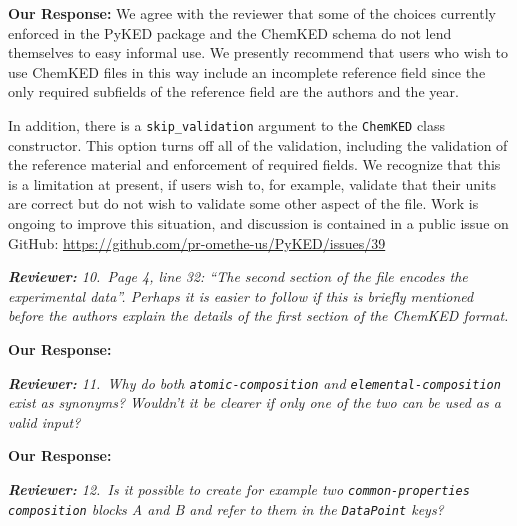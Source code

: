 \documentclass[a4paper,10pt]{elsarticle}
\newenvironment{reviewer}{\vspace{0.5\baselineskip}\begingroup\itshape\textbf{Reviewer:}}{\endgroup\vspace{0.5\baselineskip}}
\newenvironment{response}{\vspace{0.5\baselineskip}\textbf{Our Response:}}{\vspace{0.5\baselineskip}}
\begin{document}
\begin{response}
    We agree with the reviewer that some of the choices currently enforced in the PyKED package and
    the ChemKED schema do not lend themselves to easy informal use. We presently recommend that
    users who wish to use ChemKED files in this way include an incomplete reference field since the
    only required subfields of the reference field are the authors and the year.

    In addition, there is a \verb|skip_validation| argument to the \verb|ChemKED| class constructor.
    This option turns off all of the validation, including the validation of the reference material
    and enforcement of required fields. We recognize that this is a limitation at present, if users
    wish to, for example, validate that their units are correct but do not wish to validate some
    other aspect of the file. Work is ongoing to improve this situation, and discussion is contained
    in a public issue on GitHub: \url{https://github.com/pr-omethe-us/PyKED/issues/39}
\end{response}

\begin{reviewer}
    10.~Page 4, line 32: ``The second section of the file encodes the experimental data''. Perhaps
    it is easier to follow if this is briefly mentioned before the authors explain the details of
    the first section of the ChemKED format.
\end{reviewer}

\begin{response}

\end{response}

\begin{reviewer}
    11.~Why do both \texttt{atomic-composition} and \texttt{elemental-composition} exist as
    synonyms? Wouldn't it be clearer if only one of the two can be used as a valid input?
\end{reviewer}

\begin{response}

\end{response}

\begin{reviewer}
    12.~Is it possible to create for example two \texttt{common-properties} \texttt{composition}
    blocks A and B and refer to them in the \texttt{DataPoint} keys?
\end{reviewer}
\end{document}
